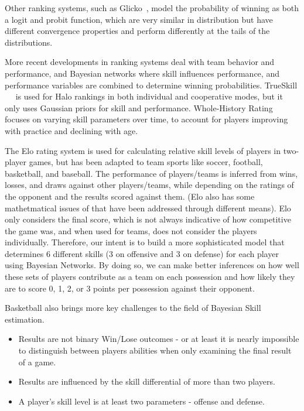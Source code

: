 \documentclass[10pt,twocolumn]{article}
\begin{document}
Other ranking systems, such as Glicko~\cite{glickman1999parameter}, model the probability of winning as both a logit and probit function, which are very similar in distribution but have different convergence properties and perform differently at the tails of the distributions.

More recent developments in ranking systems deal with team behavior and performance, and Bayesian networks where skill influences performance, and performance variables are combined to determine winning probabilities. TrueSkill ~\cite{herbrich2007trueskilltm}~ is used for Halo rankings in both individual and cooperative modes, but it only uses Gaussian priors for skill and performance. Whole-History Rating ~\cite{coulom2008whole} focuses on varying skill parameters over time, to account for players improving with practice and declining with age.

The Elo rating system is used for calculating relative skill levels of players in two-player games, but has been adapted to team sports like soccer, football, basketball, and baseball. The performance of players/teams is inferred from wins, losses, and draws against other players/teams, while depending on the ratings of the opponent and the results scored against them. (Elo also has some mathetmatical issues of that have been addressed through different means). Elo only considers the final score, which is not always indicative of how competitive the game was, and when used for teams, does not consider the players individually. Therefore, our intent is to build a more sophisticated model that determines 6 different skills (3 on offensive and 3 on defense) for each player using Bayesian Networks. By doing so, we can make better inferences on how well these sets of players contribute as a team on each possession and how likely they are to score 0, 1, 2, or 3 points per possession against their opponent. 

Basketball also brings more key challenges to the field of Bayesian Skill estimation.
\begin{itemize}
\item Results are not binary Win/Lose outcomes - or at least it is nearly impossible to distinguish between players abilities when only examining the final result of a game.
\item Results are influenced by the skill differential of more than two players.
\item A player's skill level is at least two parameters - offense and defense.
\end{itemize}
\end{document}
